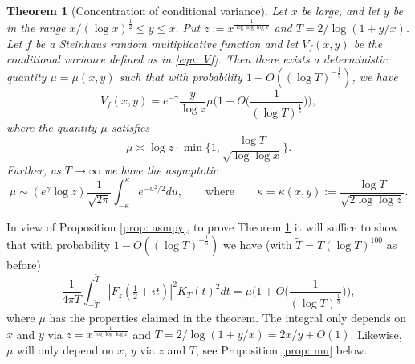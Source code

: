 \documentclass[12pt, notitlepage]{amsart}
\numberwithin{equation}{section}
\def\TT{\widetilde{T}}
\newtheorem{theorem}{Theorem}[section]
\theoremstyle{remark}
\theoremstyle{definition}
\theoremstyle{remark}
\numberwithin{equation}{section}
\begin{document}
 \begin{theorem}[Concentration of conditional variance]\label{thm: concentration} Let $x$ be large, and let $y$ be in the range $x/(\log x)^{\frac 12}\le y\le x$.  Put 
 $z:= x^{\frac{1}{\log \log \log x}}$ and $T=2/\log (1+y/x)$.   Let $f$ be a Steinhaus random multiplicative function and let $V_f(x, y)$ be the conditional variance defined as in \eqref{eqn: Vf}.  Then there exists a deterministic quantity $\mu= \mu(x,y)$ such that with probability $1- O( (\log T)^{-\frac 15})$, we have
     \[
     V_f(x, y) = e^{-\gamma } \frac{y}{\log z} \mu \Big(1  + O\Big(\frac 1{(\log T)^{\frac 15}} \Big)\Big),
     \]
     where the quantity $\mu$ satisfies 
     \[
     \mu \asymp \log z \cdot  \min\Big\{1, \frac{\log T}{\sqrt{\log \log x}}\Big\}. 
     \]
  Further, as $T \rightarrow \infty$ we have the asymptotic 
  $$
  \mu \sim (e^{\gamma} \log z) \frac{1}{\sqrt{2\pi}} \int_{-\kappa}^{\kappa}  e^{-u^{2}/2} du, 
  \qquad \text{where} \qquad \kappa = \kappa(x,y):= \frac{\log T}{\sqrt{2\log \log z}}. 
  $$ 
  \end{theorem}

In view of Proposition \ref{prop: asmpy}, to prove Theorem \ref{thm: concentration} it will suffice to show that with probability $1- O((\log T)^{-\frac 15})$ we have (with $\TT=T(\log T)^{100}$ as before)
$$
\frac{1}{4\pi T} \int_{-\TT}^{\TT } |F_z(\tfrac{1}{2}+it)|^{2} K_T(t)^{2} dt = \mu \Big(1 + O\Big(\frac{1}{(\log T)^{\frac 15}}\Big)\Big),
$$
where $\mu$ has the properties claimed in the theorem.  The integral only depends on $x$ and $y$ via $z = x^{\frac{1}{\log \log \log x}}$ and $T=2/\log(1+y/x) = 2x/y + O(1)$. Likewise, $\mu$ will only depend on $x$, $y$ via $z$ and $T$, see Proposition \ref{prop: mu} below.
\end{document}
